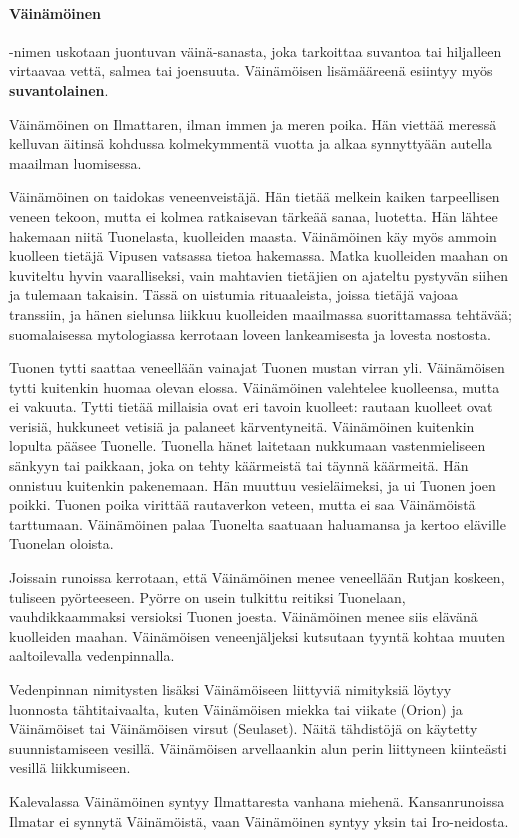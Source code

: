   \paragraph{Väinämöinen}-nimen uskotaan juontuvan väinä-sanasta, joka tarkoittaa suvantoa tai 
    hiljalleen virtaavaa vettä, salmea tai joensuuta. Väinämöisen lisämääreenä esiintyy myös 
    \textbf{suvantolainen}. \par Väinämöinen on Ilmattaren, ilman immen ja meren poika. Hän viettää 
    meressä kelluvan äitinsä kohdussa kolmekymmentä vuotta ja alkaa synnyttyään autella maailman 
    luomisessa. \par 
    Väinämöinen on taidokas veneenveistäjä. Hän tietää melkein kaiken tarpeellisen veneen tekoon, 
    mutta ei kolmea ratkaisevan tärkeää sanaa, luotetta. Hän lähtee hakemaan niitä Tuonelasta, 
    kuolleiden maasta. Väinämöinen käy myös ammoin kuolleen tietäjä Vipusen vatsassa tietoa 
    hakemassa. Matka kuolleiden maahan on kuviteltu hyvin vaaralliseksi, vain mahtavien 
    tietäjien on ajateltu pystyvän siihen ja tulemaan takaisin. Tässä on uistumia rituaaleista, 
    joissa tietäjä vajoaa transsiin, ja hänen sielunsa liikkuu kuolleiden maailmassa suorittamassa 
    tehtävää; suomalaisessa mytologiassa kerrotaan loveen lankeamisesta ja lovesta nostosta. 
    \par Tuonen tytti saattaa veneellään vainajat Tuonen mustan virran yli. Väinämöisen tytti kuitenkin 
    huomaa olevan elossa. Väinämöinen valehtelee kuolleensa, mutta ei vakuuta. Tytti tietää 
    millaisia ovat eri tavoin kuolleet: rautaan kuolleet ovat verisiä, hukkuneet vetisiä ja 
    palaneet kärventyneitä. Väinämöinen kuitenkin lopulta pääsee Tuonelle. Tuonella hänet 
    laitetaan nukkumaan vastenmieliseen sänkyyn tai paikkaan, joka on tehty käärmeistä tai 
    täynnä käärmeitä. Hän onnistuu kuitenkin pakenemaan. Hän muuttuu vesieläimeksi, ja ui Tuonen 
    joen poikki. Tuonen poika virittää rautaverkon veteen, mutta ei saa Väinämöistä tarttumaan. 
    Väinämöinen palaa Tuonelta saatuaan haluamansa ja kertoo eläville Tuonelan oloista. 
    \par Joissain runoissa kerrotaan, että Väinämöinen menee veneellään Rutjan koskeen, tuliseen 
    pyörteeseen. Pyörre on usein tulkittu reitiksi Tuonelaan, vauhdikkaammaksi versioksi Tuonen 
    joesta. Väinämöinen menee siis elävänä kuolleiden maahan. Väinämöisen veneenjäljeksi 
    kutsutaan tyyntä kohtaa muuten aaltoilevalla vedenpinnalla. 
    \par Vedenpinnan nimitysten lisäksi 
    Väinämöiseen liittyviä nimityksiä löytyy luonnosta tähtitaivaalta, kuten Väinämöisen miekka 
    tai viikate (Orion) ja Väinämöiset tai Väinämöisen virsut (Seulaset). Näitä tähdistöjä on 
    käytetty suunnistamiseen vesillä. Väinämöisen arvellaankin alun perin liittyneen kiinteästi 
    vesillä liikkumiseen. \par Kalevalassa Väinämöinen syntyy Ilmattaresta vanhana miehenä. 
    Kansanrunoissa Ilmatar ei synnytä Väinämöistä, vaan Väinämöinen syntyy yksin tai Iro-neidosta.



